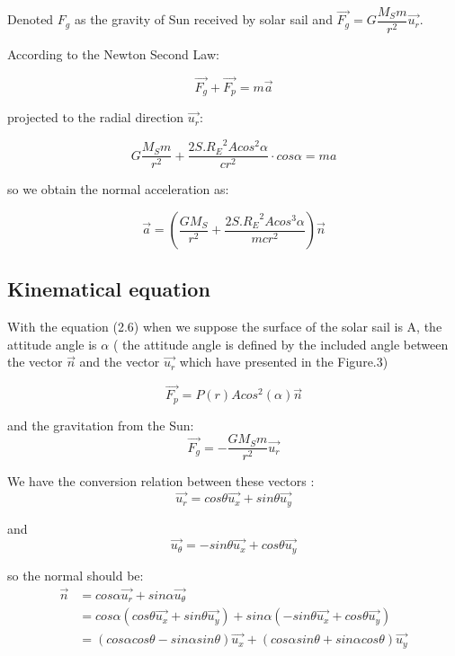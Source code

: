 \documentclass[../Paper.tex]{subfiles}
\begin{document}
Denoted $F_g$ as the gravity of Sun received by solar sail and $\vec{F_g}=G\dfrac{M_Sm}{r^2}\vec{u_r}$.

According to the Newton Second Law:

\begin{equation}
\vec{F_g}+\vec{F_p}=m\vec{a}
\end{equation}

projected to the radial direction $\vec{u_r}$:

\begin{equation}
G\dfrac{M_Sm}{r^2}+\dfrac{2S.{R_E}^2Acos^2\alpha}{cr^2}\cdot cos\alpha=ma
\end{equation}

so we obtain the normal acceleration as:

\begin{equation}
\vec{a}=\left(\dfrac{GM_S}{r^2}+\dfrac{2S.{R_E}^2Acos^3\alpha}{mcr^2}\right)\vec{n}
\end{equation}

\subsection{Kinematical equation}

With the equation (2.6) when we suppose the surface of the solar sail is A, the attitude angle is $\alpha$ ( the attitude angle is defined by the included angle between the vector $\vec{n}$ and the vector $\vec{u_r}$ which have presented in the Figure.3) 

\begin{equation}
\vec{F_p} = P(r)Acos^2(\alpha)\vec{n}
\end{equation}

and the gravitation from the Sun:
\begin{equation}
\vec{F_g}=-\frac{GM_Sm}{r^2}\vec{u_r}
\end{equation}

We have the conversion relation between these vectors :
\begin{equation}
\vec{u_r}=cos\theta \vec{u_x} + sin\theta \vec{u_y}
\end{equation}

and
\begin{equation} 
\vec{u_\theta}=-sin\theta \vec{u_x} + cos\theta \vec{u_y}
\end{equation}

so the normal should be:
\begin{align*}
\vec{n} &= cos\alpha \vec{u_r} + sin\alpha \vec{u_\theta}\\
	    &= cos\alpha (cos\theta \vec{u_x} + sin\theta \vec{u_y}) + sin\alpha (-sin\theta \vec{u_x} + cos\theta \vec{u_y})\\
	    &=(cos\alpha cos\theta - sin\alpha sin\theta )\vec{u_x} + (cos\alpha sin\theta + sin\alpha cos\theta)\vec{u_y} 
\end{align*}
\end{document}
